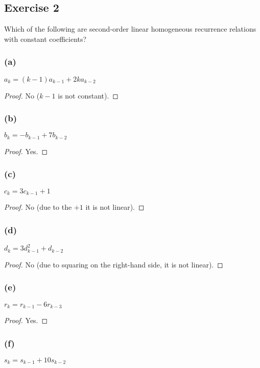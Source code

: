 \documentclass[14pt]{extarticle}
\begin{document}
\subsection{Exercise 2}
Which of the following are second-order linear homogeneous recurrence relations with constant coefficients?

\subsubsection{(a)}
\(a_k = (k-1)a_{k-1} + 2ka_{k-2}\)

\begin{proof}
    No ($k-1$ is not constant).
\end{proof}

\subsubsection{(b)}
\(b_k = -b_{k-1} + 7b_{k-2}\)

\begin{proof}
    Yes.
\end{proof}

\subsubsection{(c)}
\(c_k = 3c_{k-1} + 1\)

\begin{proof}
    No (due to the $+ 1$ it is not linear).
\end{proof}

\subsubsection{(d)}
\(d_k = 3d^2_{k-1} + d_{k-2}\)

\begin{proof}
    No (due to squaring on the right-hand side, it is not linear).
\end{proof}

\subsubsection{(e)}
\(r_k = r_{k-1} - 6r_{k-3}\)

\begin{proof}
    Yes.
\end{proof}

\subsubsection{(f)}
\(s_k = s_{k-1} + 10s_{k-2}\)
\end{document}
